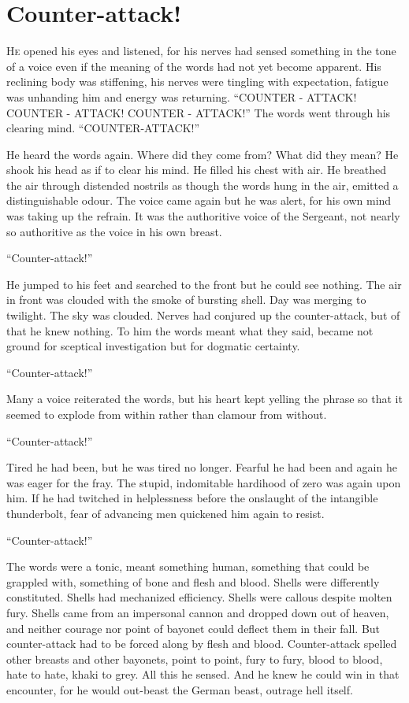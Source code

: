 \chapter*{\textsf{Counter-attack!}}

H\textsc{e} opened his eyes and listened, for his nerves had sensed something in the tone of a voice even if the meaning of the words had not yet become apparent. His reclining body was stiffening, his nerves were tingling with expectation, fatigue was unhanding him and energy was returning. ``COUNTER - ATTACK! COUNTER - ATTACK! COUNTER - ATTACK!'' The words went through his clearing mind. ``COUNTER-ATTACK!''

He heard the words again. Where did they come from? What did they mean? He shook his head as if to clear his mind. He filled his chest with air. He breathed the air through distended nostrils as though the words hung in the air, emitted a distinguishable odour. The voice came again but he was alert, for his own mind was taking up the refrain. It was the authoritive voice of the Sergeant, not nearly so authoritive as the voice in his own breast.

``Counter-attack!''

He jumped to his feet and searched to the front but he could see nothing. The air in front was clouded with the smoke of bursting shell. Day was merging to twilight. The sky was clouded. Nerves had conjured up the counter-attack, but of that he knew nothing. To him the words meant what they said, became not ground for sceptical investigation but for dogmatic certainty.

``Counter-attack!''

Many a voice reiterated the words, but his heart kept yelling the phrase so that it seemed to explode from within rather than clamour from without.

``Counter-attack!''

Tired he had been, but he was tired no longer. Fearful he had been and again he was eager for the fray. The stupid, indomitable hardihood of zero was again upon him. If he had twitched in helplessness before the onslaught of the intangible thunderbolt, fear of advancing men quickened him again to resist.

``Counter-attack!''

The words were a tonic, meant something human, something that could be grappled with, something of bone and flesh and blood. Shells were differently constituted. Shells had mechanized efficiency. Shells were callous despite molten fury. Shells came from an impersonal cannon and dropped down out of heaven, and neither courage nor point of bayonet could deflect them in their fall. But counter-attack had to be forced along by flesh and blood. Counter-attack spelled other breasts and other bayonets, point to point, fury to fury, blood to blood, hate to hate, khaki to grey. All this he sensed. And he knew he could win in that encounter, for he would out-beast the German beast, outrage hell itself.


